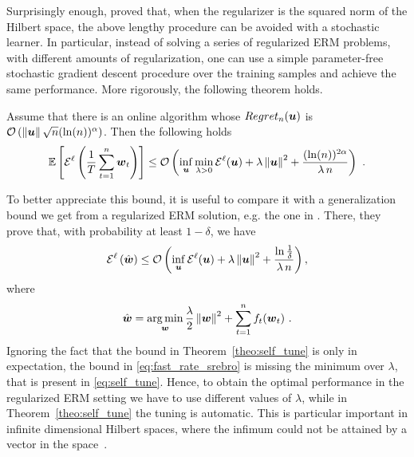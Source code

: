 Surprisingly enough, \citep{Orabona14} proved that, when the regularizer is the squared norm of the Hilbert space, the above lengthy procedure can be avoided with a stochastic learner.
In particular, instead of solving a series of regularized ERM problems, with different amounts of regularization, one can use a simple parameter-free stochastic gradient descent procedure over the training samples and achieve the same performance.
More rigorously, the following theorem holds.
\begin{theorem}
\label{theo:self_tune}
Assume that there is an online algorithm whose $Regret_n(\boldsymbol{u})$ is $\mathcal{O}\left(\left\|{\boldsymbol{u}}\right\|\sqrt{n} (\ln(n))^\alpha\right)$. Then the following holds
\begin{equation}
\label{eq:self_tune}
\mathbb{E}\left[\mathcal{E}^{\ell}\left(\frac{1}{T} \sum_{t=1}^n \boldsymbol{w}_t\right)\right] \leq \mathcal{O}\left(\inf_{\boldsymbol{u}} \min_{\lambda>0} \mathcal{E}^{\ell}(\boldsymbol{u}) + \lambda \left\|{\boldsymbol{u}}\right\|^2 +\frac{(\ln(n))^{2 \alpha}}{\lambda \, n} \right)~.
\end{equation}
\end{theorem}
To better appreciate this bound, it is useful to compare it with a generalization bound we get from a regularized \ac{ERM} solution, e.g. the one in \citet{SridharanSSS09}.
There, they prove that, with probability at least $1-\delta$, we have
\begin{equation}
\label{eq:fast_rate_srebro}
\mathcal{E}^{\ell}\left(\hat{\boldsymbol{w}}\right) \leq \mathcal{O}\left(\inf_{\boldsymbol{u}} \mathcal{E}^{\ell}(\boldsymbol{u}) + \lambda \left\|{\boldsymbol{u}}\right\|^2 +\frac{\ln \frac{1}{\delta}}{\lambda \, n} \right),
\end{equation}
where 
\begin{align*}
\hat{\boldsymbol{w}}=\operatorname*{arg\,min}_{\boldsymbol{w}} \frac{\lambda}{2}\left\|{\boldsymbol{w}}\right\|^2 + \sum_{t=1}^n f_t(\boldsymbol{w}_t)~.
\end{align*}
Ignoring the fact that the bound in Theorem~\ref{theo:self_tune} is only in expectation, the bound in \eqref{eq:fast_rate_srebro} is missing the minimum over $\lambda$, that is present in \eqref{eq:self_tune}. Hence, to obtain the optimal performance in the regularized \ac{ERM} setting we have to use different values of $\lambda$, while in Theorem~\ref{theo:self_tune} the tuning is automatic. This is particular important in infinite dimensional Hilbert spaces, where the infimum could not be attained by a vector in the space~\cite{Orabona14}.

